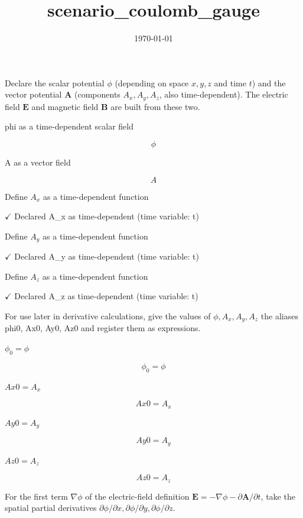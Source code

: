\documentclass[dvipdfmx]{article}
\title{scenario\_coulomb\_gauge}
\date{\today}
\begin{document}
\maketitle

Declare the scalar potential $\phi$ (depending on space $x,y,z$ and time $t$) and the vector potential $\mathbf A$ (components $A_x,A_y,A_z$, also time-dependent). The electric field $\mathbf E$ and magnetic field $\mathbf B$ are built from these two.

phi as a time-dependent scalar field

\[
  \phi
\]

A as a vector field

\[
  A
\]

Define $A_x$ as a time-dependent function

$\checkmark$ Declared A\_x as time-dependent (time variable: t)

Define $A_y$ as a time-dependent function

$\checkmark$ Declared A\_y as time-dependent (time variable: t)

Define $A_z$ as a time-dependent function

$\checkmark$ Declared A\_z as time-dependent (time variable: t)

For use later in derivative calculations, give the values of $\phi,A_x,A_y,A_z$ the aliases phi0, Ax0, Ay0, Az0 and register them as expressions.

$\phi_{0} = \phi$

\begin{equation}
  \phi_{0} = \phi
  \label{eq:E1}
\end{equation}

$Ax0 = A_x$

\begin{equation}
  Ax0 = A_x
  \label{eq:E2}
\end{equation}

$Ay0 = A_y$

\begin{equation}
  Ay0 = A_y
  \label{eq:E3}
\end{equation}

$Az0 = A_z$

\begin{equation}
  Az0 = A_z
  \label{eq:E4}
\end{equation}

For the first term $\nabla\phi$ of the electric-field definition $\mathbf E=-\nabla\phi-\partial\mathbf A/\partial t$, take the spatial partial derivatives $\partial\phi/\partial x,\partial\phi/\partial y,\partial\phi/\partial z$.
\end{document}

